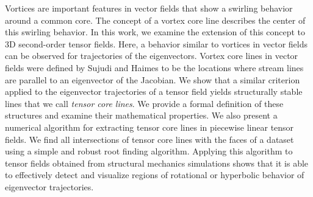 
%
Vortices are important features in vector fields that show a swirling behavior
around a common core.
%
The concept of a vortex core line describes the center of this swirling
behavior.
%
In this work, we examine the extension of this concept to 3D second-order
tensor fields.
%
Here, a behavior similar to vortices in vector fields can be observed for
trajectories of the eigenvectors.
%
Vortex core lines in vector fields were defined by Sujudi and Haimes to be the
locations where stream lines are parallel to an eigenvector of the Jacobian.
%
We show that a similar criterion applied to the eigenvector trajectories of a
tensor field yields structurally stable lines that we call \emph{tensor core
lines}.
%
We provide a formal definition of these structures and examine their
mathematical properties.
%
We also present a numerical algorithm for extracting tensor core lines in
piecewise linear tensor fields.
%
We find all intersections of tensor core lines with the faces of a dataset using
a simple and robust root finding algorithm.
%
Applying this algorithm to tensor fields obtained from structural mechanics
simulations shows that it is able to effectively detect and visualize regions of
rotational or hyperbolic behavior of eigenvector trajectories.
%